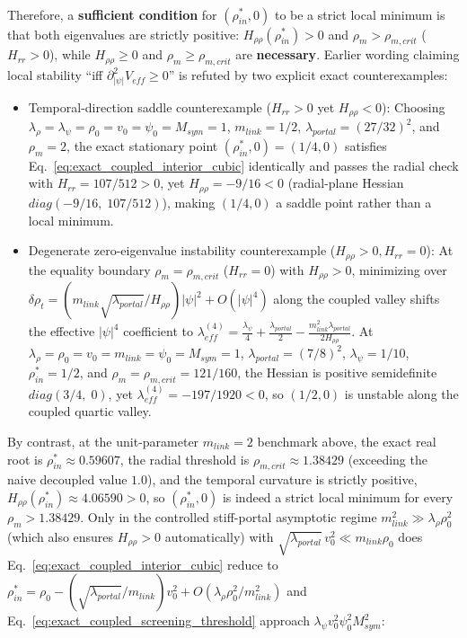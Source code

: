 \documentclass[american,11pt,letterpaper]{article}
\def\mathrm#1{#1}%
\def\emph#1{#1}%
\begin{document}
\begin{enumerate}[leftmargin=2em]
\begin{align}
  \end{align}
  Therefore, a \textbf{sufficient condition} for $(\rho_{\mathrm{in}}^*, 0)$ to be a strict local minimum is that \emph{both} eigenvalues are strictly positive: $H_{\rho\rho}(\rho_{\mathrm{in}}^*) > 0$ \emph{and} $\rho_m > \rho_{m,\mathrm{crit}}$ ($H_{rr} > 0$), while $H_{\rho\rho} \ge 0$ and $\rho_m \ge \rho_{m,\mathrm{crit}}$ are \textbf{necessary}. Earlier wording claiming local stability ``iff $\partial_{|\psi|}^2 V_{\mathrm{eff}} \ge 0$'' is refuted by two explicit exact counterexamples:
  \begin{itemize}
    \item \emph{Temporal-direction saddle counterexample ($H_{rr} > 0$ yet $H_{\rho\rho} < 0$):} Choosing $\lambda_\rho = \lambda_\psi = \rho_0 = v_0 = \psi_0 = M_{\mathrm{sym}} = 1$, $m_{\mathrm{link}} = 1/2$, $\lambda_{\mathrm{portal}} = (27/32)^2$, and $\rho_m = 2$, the exact stationary point $(\rho_{\mathrm{in}}^*, 0) = (1/4, 0)$ satisfies Eq.~\eqref{eq:exact_coupled_interior_cubic} identically and passes the radial check with $H_{rr} = 107/512 > 0$, yet $H_{\rho\rho} = -9/16 < 0$ (radial-plane Hessian $\mathrm{diag}(-9/16,\; 107/512)$), making $(1/4, 0)$ a \emph{saddle point} rather than a local minimum.
    \item \emph{Degenerate zero-eigenvalue instability counterexample ($H_{\rho\rho} > 0, H_{rr} = 0$):} At the equality boundary $\rho_m = \rho_{m,\mathrm{crit}}$ ($H_{rr} = 0$) with $H_{\rho\rho} > 0$, minimizing over $\delta\rho_t = (m_{\mathrm{link}}\sqrt{\lambda_{\mathrm{portal}}}/H_{\rho\rho})|\psi|^2 + O(|\psi|^4)$ along the coupled valley shifts the effective $|\psi|^4$ coefficient to $\lambda_{\mathrm{eff}}^{(4)} = \frac{\lambda_\psi}{4} + \frac{\lambda_{\mathrm{portal}}}{2} - \frac{m_{\mathrm{link}}^2\lambda_{\mathrm{portal}}}{2 H_{\rho\rho}}$. At $\lambda_\rho = \rho_0 = v_0 = m_{\mathrm{link}} = \psi_0 = M_{\mathrm{sym}} = 1$, $\lambda_{\mathrm{portal}} = (7/8)^2$, $\lambda_\psi = 1/10$, $\rho_{\mathrm{in}}^* = 1/2$, and $\rho_m = \rho_{m,\mathrm{crit}} = 121/160$, the Hessian is positive semidefinite $\mathrm{diag}(3/4,\; 0)$, yet $\lambda_{\mathrm{eff}}^{(4)} = -197/1920 < 0$, so $(1/2, 0)$ is \emph{unstable} along the coupled quartic valley.
  \end{itemize}
  By contrast, at the unit-parameter $m_{\mathrm{link}} = 2$ benchmark above, the exact real root is $\rho_{\mathrm{in}}^* \approx 0.59607$, the radial threshold is $\rho_{m,\mathrm{crit}} \approx 1.38429$ (exceeding the naive decoupled value $1.0$), and the temporal curvature is strictly positive, $H_{\rho\rho}(\rho_{\mathrm{in}}^*) \approx 4.06590 > 0$, so $(\rho_{\mathrm{in}}^*, 0)$ is indeed a strict local minimum for every $\rho_m > 1.38429$. Only in the controlled \emph{stiff-portal asymptotic regime} $m_{\mathrm{link}}^2 \gg \lambda_\rho\rho_0^2$ (which also ensures $H_{\rho\rho} > 0$ automatically) with $\sqrt{\lambda_{\mathrm{portal}}}\,v_0^2 \ll m_{\mathrm{link}}\rho_0$ does Eq.~\eqref{eq:exact_coupled_interior_cubic} reduce to $\rho_{\mathrm{in}}^* = \rho_0 - (\sqrt{\lambda_{\mathrm{portal}}}/m_{\mathrm{link}})v_0^2 + O(\lambda_\rho\rho_0^2/m_{\mathrm{link}}^2)$ and Eq.~\eqref{eq:exact_coupled_screening_threshold} approach $\lambda_\psi v_0^2\psi_0^2 M_{\mathrm{sym}}^2$:

\end{enumerate}
\end{document}
